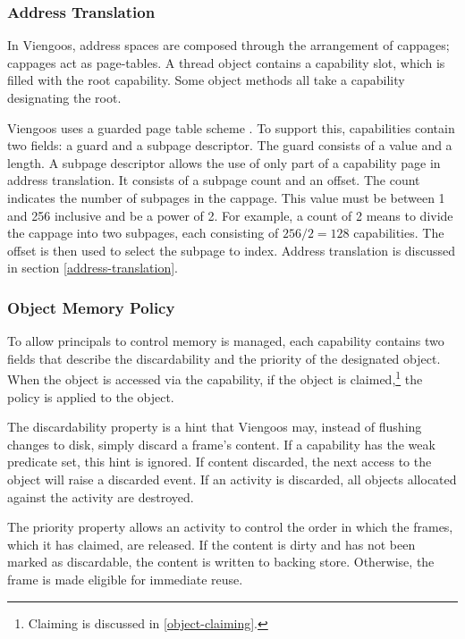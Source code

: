\subsubsection{Address Translation}

In Viengoos, address spaces are composed through the arrangement of
cappages; cappages act as page-tables.  A thread object contains a
capability slot, which is filled with the root capability.  Some
object methods all take a capability designating the root.

Viengoos uses a guarded page table scheme
\cite{liedtke94page-table-structures-for-fine-grain-vm}.  To support
this, capabilities contain two fields: a guard and a subpage
descriptor.  The guard consists of a value and a length.  A subpage
descriptor allows the use of only part of a capability page in address
translation.  It consists of a subpage count and an offset.  The count
indicates the number of subpages in the cappage.  This value must be
between 1 and 256 inclusive and be a power of 2.  For example, a count
of 2 means to divide the cappage into two subpages, each consisting of
$256 / 2 = 128$ capabilities.  The offset is then used to select the
subpage to index.  Address translation is discussed in section
\ref{address-translation}.

\subsubsection{Object Memory Policy}

To allow principals to control memory is managed, each capability
contains two fields that describe the discardability and the priority
of the designated object.  When the object is accessed via the
capability, if the object is claimed,\footnote{Claiming is discussed
  in \ref{object-claiming}.} the policy is applied to the object.

The discardability property is a hint that Viengoos may, instead of
flushing changes to disk, simply discard a frame's content.  If a
capability has the weak predicate set, this hint is ignored.  If
content discarded, the next access to the object will raise a
discarded event.  If an activity is discarded, all objects allocated
against the activity are destroyed.

The priority property allows an activity to control the order in which
the frames, which it has claimed, are released.  If the content is
dirty and has not been marked as discardable, the content is written
to backing store.  Otherwise, the frame is made eligible for immediate
reuse.


